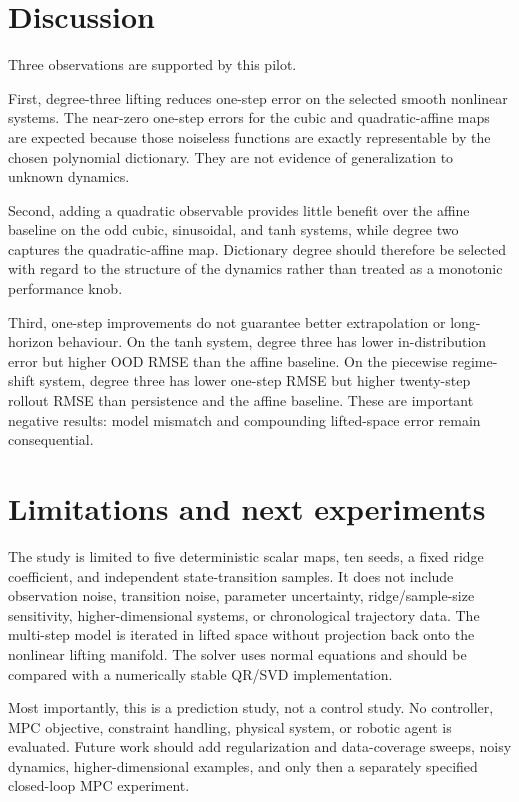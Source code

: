 \documentclass[11pt]{article}
\begin{document}
\section{Discussion}
Three observations are supported by this pilot.

First, degree-three lifting reduces one-step error on the selected smooth nonlinear systems. The near-zero one-step errors for the cubic and quadratic-affine maps are expected because those noiseless functions are exactly representable by the chosen polynomial dictionary. They are not evidence of generalization to unknown dynamics.

Second, adding a quadratic observable provides little benefit over the affine baseline on the odd cubic, sinusoidal, and tanh systems, while degree two captures the quadratic-affine map. Dictionary degree should therefore be selected with regard to the structure of the dynamics rather than treated as a monotonic performance knob.

Third, one-step improvements do not guarantee better extrapolation or long-horizon behaviour. On the tanh system, degree three has lower in-distribution error but higher OOD RMSE than the affine baseline. On the piecewise regime-shift system, degree three has lower one-step RMSE but higher twenty-step rollout RMSE than persistence and the affine baseline. These are important negative results: model mismatch and compounding lifted-space error remain consequential.

\section{Limitations and next experiments}
The study is limited to five deterministic scalar maps, ten seeds, a fixed ridge coefficient, and independent state-transition samples. It does not include observation noise, transition noise, parameter uncertainty, ridge/sample-size sensitivity, higher-dimensional systems, or chronological trajectory data. The multi-step model is iterated in lifted space without projection back onto the nonlinear lifting manifold. The solver uses normal equations and should be compared with a numerically stable QR/SVD implementation.

Most importantly, this is a prediction study, not a control study. No controller, MPC objective, constraint handling, physical system, or robotic agent is evaluated. Future work should add regularization and data-coverage sweeps, noisy dynamics, higher-dimensional examples, and only then a separately specified closed-loop MPC experiment.
\end{document}
